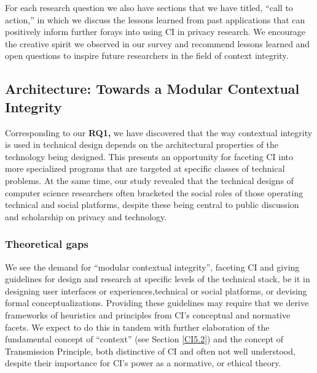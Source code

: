 \documentclass[../thesis.tex]{subfiles}
\begin{document}
For each research question we also have
sections that we have titled, ``call to
action,'' in which we discuss the lessons learned
from past applications that can positively inform further forays into
using CI in privacy research. We encourage the creative spirit we
observed in our survey and recommend lessons learned and open questions
to inspire future researchers in the field of context integrity.

\subsection{Architecture: Towards a Modular Contextual Integrity}
\label{CI5.1}

Corresponding to our
\textbf{RQ1,}
we have discovered that the way contextual integrity is used in
technical design depends on the architectural properties of the
technology being designed. This presents an opportunity for faceting CI
into more specialized programs that are targeted at specific classes of
technical problems. At the same time, our study revealed that the
technical designs of computer science researchers often bracketed the
social roles of those operating technical and social platforms, despite
these being central to public discussion and scholarship on privacy and
technology.

\subsubsection{Theoretical gaps}
\label{CI5.1.1}

We see the demand for ``modular contextual
integrity'', faceting CI and giving guidelines for
design and research at specific levels of the technical stack, be it in
designing user interfaces or experiences,technical or social platforms,
or devising formal conceptualizations. Providing these guidelines may
require that we derive frameworks of heuristics and principles from
CI's conceptual and normative facets. We expect to do
this in tandem with further elaboration of the fundamental concept of
``context'' (see Section \ref{CI5.2}) and
the concept of Transmission Principle, both distinctive of CI and often
not well understood, despite their importance for CI's
power as a normative, or ethical theory. 
\end{document}
